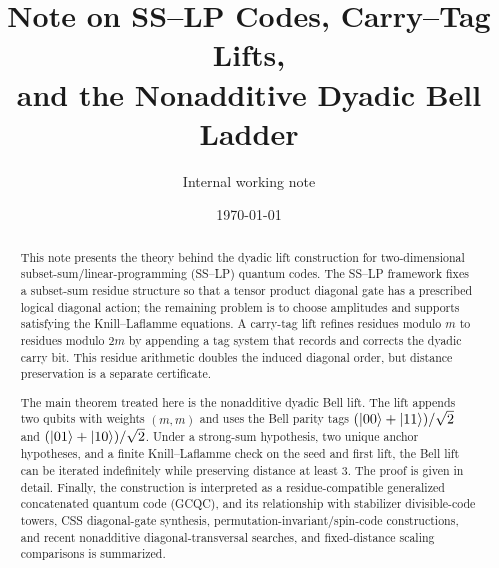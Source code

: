 \documentclass[11pt]{article}
\title{Note on SS--LP Codes, Carry--Tag Lifts,\\
       and the Nonadditive Dyadic Bell Ladder}
\author{Internal working note}
\date{\today}
\begin{document}
\maketitle

\begin{abstract}
This note presents the theory behind the dyadic lift construction for two-dimensional
subset-sum/linear-programming (SS--LP) quantum codes.  The SS--LP framework fixes a
subset-sum residue structure so that a tensor product diagonal gate has a prescribed logical
diagonal action; the remaining problem is to choose amplitudes and supports satisfying the
Knill--Laflamme equations.  A carry-tag lift refines residues modulo $m$ to residues modulo
$2m$ by appending a tag system that records and corrects the dyadic carry bit.  This residue
arithmetic doubles the induced diagonal order, but distance preservation is a separate
certificate.

The main theorem treated here is the nonadditive dyadic Bell lift.  The lift appends two
qubits with weights $(m,m)$ and uses the Bell parity tags
$(\ket{00}+\ket{11})/\sqrt2$ and $(\ket{01}+\ket{10})/\sqrt2$.  Under a strong-sum
hypothesis, two unique anchor hypotheses, and a finite Knill--Laflamme check on the seed and
first lift, the Bell lift can be iterated indefinitely while preserving distance at least $3$.
The proof is given in detail.  Finally, the construction is interpreted as a residue-compatible
generalized concatenated quantum code (GCQC), and its relationship with stabilizer divisible-code
towers, CSS diagonal-gate synthesis, permutation-invariant/spin-code constructions, and recent
nonadditive diagonal-transversal searches, and fixed-distance scaling comparisons is summarized.
\end{abstract}

\begin{center}
\end{center}
\end{document}
